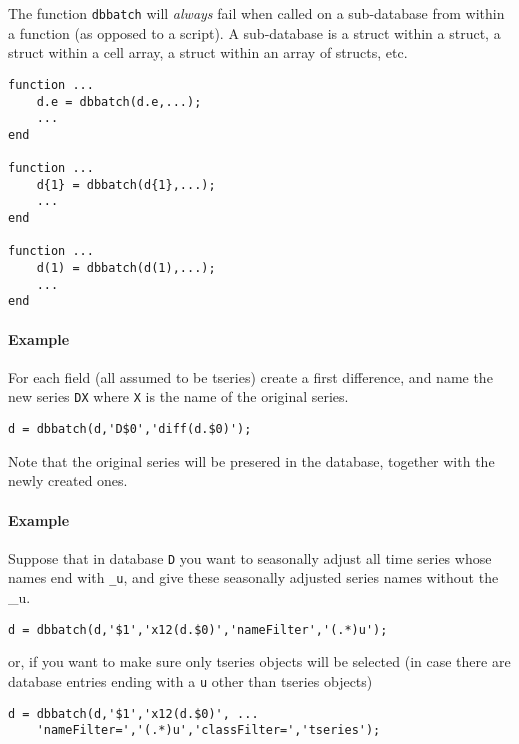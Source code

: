 The function \texttt{dbbatch} will \emph{always} fail when called on a
sub-database from within a function (as opposed to a script). A
sub-database is a struct within a struct, a struct within a cell array,
a struct within an array of structs, etc.

\begin{verbatim}
function ...
    d.e = dbbatch(d.e,...);
    ...
end

function ...
    d{1} = dbbatch(d{1},...);
    ...
end

function ...
    d(1) = dbbatch(d(1),...);
    ...
end
\end{verbatim}

\paragraph{Example}

For each field (all assumed to be tseries) create a first difference,
and name the new series \texttt{DX} where \texttt{X} is the name of the
original series.

\begin{verbatim}
d = dbbatch(d,'D$0','diff(d.$0)');
\end{verbatim}

Note that the original series will be presered in the database, together
with the newly created ones.

\paragraph{Example}

Suppose that in database \texttt{D} you want to seasonally adjust all
time series whose names end with \texttt{\_u}, and give these seasonally
adjusted series names without the \_u.

\begin{verbatim}
d = dbbatch(d,'$1','x12(d.$0)','nameFilter','(.*)u');
\end{verbatim}

or, if you want to make sure only tseries objects will be selected (in
case there are database entries ending with a \texttt{u} other than
tseries objects)

\begin{verbatim}
d = dbbatch(d,'$1','x12(d.$0)', ...
    'nameFilter=','(.*)u','classFilter=','tseries');
\end{verbatim}


